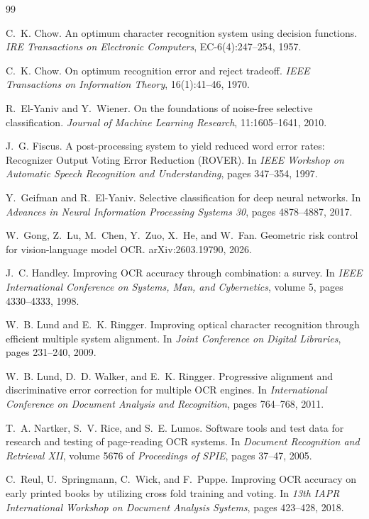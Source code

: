 \documentclass[11pt,a4paper]{article}
\begin{document}
\begin{thebibliography}{99}

 C.~K. Chow. An optimum character recognition system using decision
functions. \emph{IRE Transactions on Electronic Computers}, EC-6(4):247--254, 1957.

 C.~K. Chow. On optimum recognition error and reject tradeoff.
\emph{IEEE Transactions on Information Theory}, 16(1):41--46, 1970.

 R.~El-Yaniv and Y.~Wiener. On the foundations of noise-free
selective classification. \emph{Journal of Machine Learning Research}, 11:1605--1641,
2010.

 J.~G. Fiscus. A post-processing system to yield reduced word error
rates: Recognizer Output Voting Error Reduction (ROVER). In \emph{IEEE Workshop on
Automatic Speech Recognition and Understanding}, pages 347--354, 1997.

 Y.~Geifman and R.~El-Yaniv. Selective classification for deep
neural networks. In \emph{Advances in Neural Information Processing Systems 30}, pages
4878--4887, 2017.

 W.~Gong, Z.~Lu, M.~Chen, Y.~Zuo, X.~He, and W.~Fan. Geometric
risk control for vision-language model OCR. arXiv:2603.19790, 2026.

 J.~C. Handley. Improving OCR accuracy through combination: a
survey. In \emph{IEEE International Conference on Systems, Man, and Cybernetics}, volume
5, pages 4330--4333, 1998.

 W.~B. Lund and E.~K. Ringger. Improving optical character recognition
through efficient multiple system alignment. In \emph{Joint Conference on Digital
Libraries}, pages 231--240, 2009.

 W.~B. Lund, D.~D. Walker, and E.~K. Ringger. Progressive alignment and
discriminative error correction for multiple OCR engines. In \emph{International
Conference on Document Analysis and Recognition}, pages 764--768, 2011.

 T.~A. Nartker, S.~V. Rice, and S.~E. Lumos. Software tools and test
data for research and testing of page-reading OCR systems. In \emph{Document Recognition
and Retrieval XII}, volume 5676 of \emph{Proceedings of SPIE}, pages 37--47, 2005.

 C.~Reul, U.~Springmann, C.~Wick, and F.~Puppe. Improving OCR accuracy
on early printed books by utilizing cross fold training and voting. In \emph{13th IAPR
International Workshop on Document Analysis Systems}, pages 423--428, 2018.


\end{thebibliography}
\end{document}
